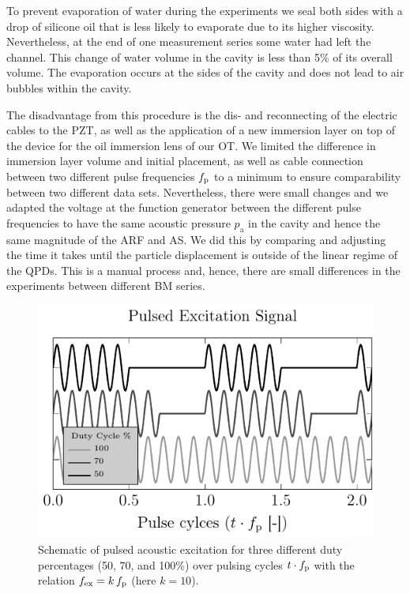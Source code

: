 To prevent evaporation of water during the experiments we seal both sides with 
a drop of silicone oil that is less likely to evaporate due to its higher 
viscosity. Nevertheless, at the end of one measurement series some water had 
left the channel. This change of water volume in the cavity is less than 5\% of 
its overall volume. The evaporation occurs at the sides of the cavity and does 
not lead to air bubbles within the cavity.

The disadvantage from this procedure is the dis- and reconnecting of the 
electric cables to the PZT, as well as the application of a new immersion layer 
on top of the device for the oil immersion lens of our OT. We limited the 
difference in immersion layer volume and initial placement, as well as cable 
connection between two different pulse frequencies $f_{\mathrm{p}}$ to a minimum to ensure 
comparability between two different data sets. Nevertheless, there were small 
changes and we adapted the voltage at the function generator between the 
different pulse frequencies to have the same acoustic pressure $p_{\mathrm{a}}$ 
in the cavity and hence the same magnitude of the ARF and AS. We did this by 
comparing and adjusting the time it takes until the particle displacement is 
outside of the linear regime of the QPDs. This is a manual process and, hence, 
there are small differences in the experiments between different BM series.


\begin{figure}[tbp]
  \centering
  \includegraphics[]{External/PU-duty-cycle.pdf}
  \caption{Schematic of pulsed acoustic excitation for three different duty 
      percentages (50, 70, and 100\%) over pulsing cycles $t\cdot f_{\mathrm{p}}$ with the 
      relation $f_{\mathrm{ex}}=k\,f_{\mathrm{p}}$ (here $k=10$).
  }\label{fig:PU-duty_cycle}
\end{figure}

